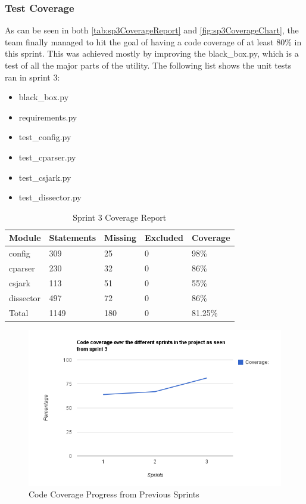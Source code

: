 \subsubsection{Test Coverage}
As can be seen in both \autoref{tab:sp3CoverageReport} and \autoref{fig:sp3CoverageChart}, the team finally managed to hit the goal of having a code coverage of at least 80\% in this sprint. This was achieved mostly by improving the black\_box.py, which is a test of all the major parts of the \gls{utility}. The following list shows the unit tests ran in sprint 3:

\begin{itemize}
	\item black\_box.py
	\item requirements.py
	\item test\_config.py
	\item test\_cparser.py
	\item test\_csjark.py
	\item test\_dissector.py
\end{itemize}

\begin{table}[!htb]\footnotesize\center
	\caption{Sprint 3 Coverage Report\label{tab:sp3CoverageReport}}
	\begin{tabular}{l l l l l}
		\toprule
		Module & Statements & Missing & Excluded & Coverage\\
		\midrule
		config & 309 & 25 & 0 & 98\%\ \\
		cparser & 230 & 32 & 0 & 86\%\ \\
		csjark & 113 & 51 & 0 & 55\%\ \\
		dissector & 497 & 72 & 0 & 86\%\ \\
		Total & 1149 & 180  & 0 & 81.25\%\ \\
		\bottomrule
	\end{tabular}
\end{table}

\begin{figure}[ht]
	\center
	\includegraphics[width=\textwidth]{./sprints/img/sprint3_code_coverage_chart.png}
	\caption{Code Coverage Progress from Previous Sprints\label{fig:sp3CoverageChart}}
\end{figure}


